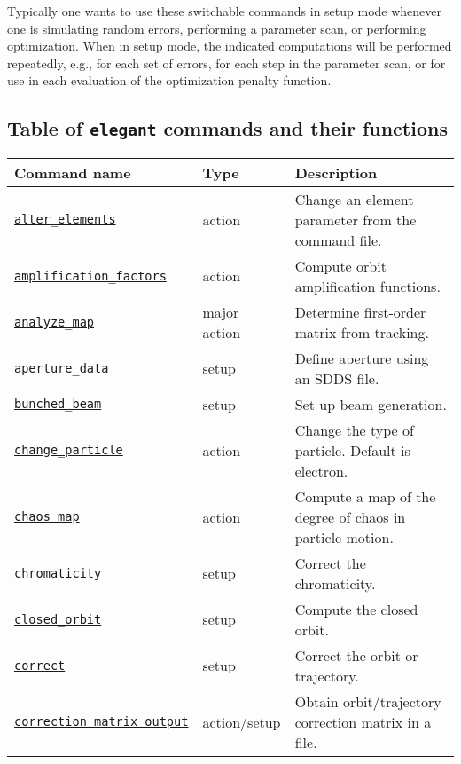 \documentclass[11pt]{article}
\begin{document}
Typically one wants to use these switchable commands in setup mode whenever one is
simulating random errors, performing a parameter scan, or performing optimization.
When in setup mode, the indicated computations will be performed repeatedly, e.g.,
for each set of errors, for each step in the parameter scan, or for use in each
evaluation of the optimization penalty function.

\newpage
\subsection{Table of {\tt elegant} commands and their functions}

\begin{longtable}{|p{2.75in}|p{0.75in}|p{2.75in}|}
\hline
Command name & Type & Description \\\hline 
\hyperref[subsec:alterelements]{\tt alter\_elements} & action & Change an element parameter from the command file. \\ \hline
\hyperref[subsec:amplificationfactors]{\tt amplification\_factors} & action & Compute orbit amplification functions. \\ \hline
\hyperref[subsec:analyzemap]{\tt analyze\_map} & major action & Determine first-order matrix from tracking. \\ \hline
\hyperref[subsec:aperturedata]{\tt aperture\_data} & setup & Define aperture using an SDDS file. \\ \hline
\hyperref[subsec:bunchedbeam]{\tt bunched\_beam} & setup & Set up beam generation. \\ \hline
\hyperref[subsec:changeparticle]{\tt change\_particle} & action & Change the type of particle. Default is electron.\\ \hline
\hyperref[subsec:chaosmap]{\tt chaos\_map} & action & Compute a map of the degree of chaos in particle motion.\\ \hline
\hyperref[subsec:chromaticity]{\tt chromaticity} & setup & Correct the chromaticity. \\ \hline
\hyperref[subsec:closedorbit]{\tt closed\_orbit} & setup & Compute the closed orbit. \\ \hline
\hyperref[subsec:correct]{\tt correct} & setup & Correct the orbit or trajectory. \\ \hline
\hyperref[subsec:correctionmatrixoutput]{\tt correction\_matrix\_output} & action/setup & Obtain orbit/trajectory correction matrix in a file. \\ \hline

\end{longtable}
\end{document}
